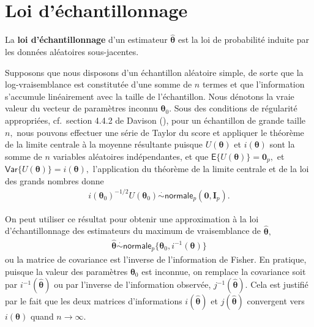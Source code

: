 \documentclass[
  11pt,
  letterpaper,
]{scrbook}
\theoremstyle{plain}
\theoremstyle{plain}
\theoremstyle{definition}
\theoremstyle{definition}
\theoremstyle{remark}
\begin{document}
\section{Loi d'échantillonnage}\label{loi-duxe9chantillonnage}

La \textbf{loi d'échantillonnage} d'un estimateur
\(\widehat{\boldsymbol{\theta}}\) est la loi de probabilité induite par
les données aléatoires sous-jacentes.

Supposons que nous disposons d'un échantillon aléatoire simple, de sorte
que la log-vraisemblance est constitutée d'une somme de \(n\) termes et
que l'information s'accumule linéairement avec la taille de
l'échantillon. Nous dénotons la vraie valeur du vecteur de paramètres
inconnu \(\boldsymbol{\theta}_0.\) Sous des conditions de régularité
appropriées, cf.~section 4.4.2 de Davison
(), pour un échantillon de grande
taille \(n,\) nous pouvons effectuer une série de Taylor du score et
appliquer le théorème de la limite centrale à la moyenne résultante
puisque \(U(\boldsymbol{\theta})\) et \(i(\boldsymbol{\theta})\) sont la
somme de \(n\) variables aléatoires indépendantes, et que
\(\mathsf{E}\{U(\boldsymbol{\theta})\}=\boldsymbol{0}_p,\) et
\(\mathsf{Var}\{U(\boldsymbol{\theta})\}=i(\boldsymbol{\theta}),\)
l'application du théorème de la limite centrale et de la loi des grands
nombres donne \begin{align*}
i(\boldsymbol{\theta}_0)^{-1/2}U(\boldsymbol{\theta}_0) \stackrel{\cdot}{\sim}\mathsf{normale}_p(\boldsymbol{0}, \mathbf{I}_p).
\end{align*}

On peut utiliser ce résultat pour obtenir une approximation à la loi
d'échantillonnage des estimateurs du maximum de vraisemblance de
\(\widehat{\boldsymbol{\theta}},\) \begin{align*}
\widehat{\boldsymbol{\theta}} \stackrel{\cdot}{\sim} \mathsf{normale}_p\{\boldsymbol{\theta}_0, i^{-1}(\boldsymbol{\theta})\}
\end{align*} ou la matrice de covariance est l'inverse de l'information
de Fisher. En pratique, puisque la valeur des paramètres
\(\boldsymbol{\theta}_0\) est inconnue, on remplace la covariance soit
par \(i^{-1}(\widehat{\boldsymbol{\theta}})\) ou par l'inverse de
l'information observée, \(j^{-1}(\widehat{\boldsymbol{\theta}}).\) Cela
est justifié par le fait que les deux matrices d'informations
\(i(\widehat{\boldsymbol{\theta}})\) et
\(j(\widehat{\boldsymbol{\theta}})\) convergent vers
\(i(\boldsymbol{\theta})\) quand \(n \to \infty.\)
\end{document}
